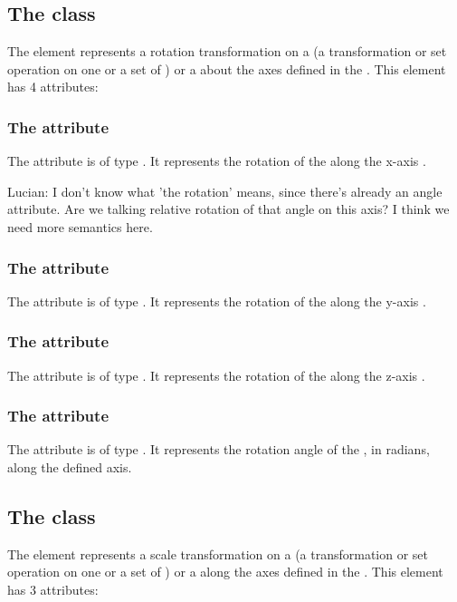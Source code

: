 \subsection{The  class}
\label{CSGRotation-class}
The \CSGRotation element represents a rotation transformation on a \CSGNode (a transformation or set operation on one or a set of \CSGPrimitives) or a \CSGPrimitive about the axes defined in the \Geometry. This element has 4 attributes:

\subsubsection{The  attribute}
The  attribute is of type . It represents the rotation of the \CSGNode along the x-axis .

{\color{red} Lucian: \notice I don't know what 'the rotation' means, since there's already an angle attribute.  Are we talking relative rotation of that angle on this axis?  I think we need more semantics here.}

\subsubsection{The  attribute}
The  attribute is of type . It represents the rotation of the \CSGNode along the y-axis .

\subsubsection{The  attribute}
The  attribute is of type . It represents the rotation of the \CSGNode along the z-axis .


\subsubsection{The  attribute}
The  attribute is of type . It represents the rotation angle of the \CSGNode, in radians, along the defined axis.


\subsection{The  class}
\label{CSGScale-class}
The \CSGScale element represents a scale transformation on a \CSGNode (a transformation or set operation on one or a set of \CSGPrimitives) or a \CSGPrimitive along the axes defined in the \Geometry. This element has 3 attributes:

